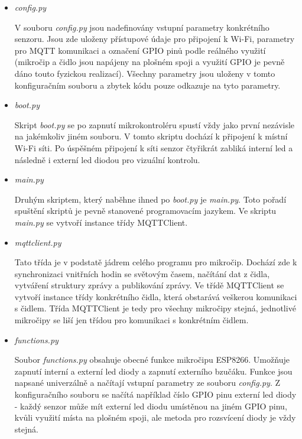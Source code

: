 \begin{itemize}
  \item \textit{config.py} 
  
V souboru \textit{config.py} jsou nadefinovány vstupní parametry konkrétního senzoru. Jsou zde uloženy přístupové údaje pro připojení k Wi-Fi, parametry pro MQTT komunikaci a označení GPIO pinů podle reálného využití (mikročip a čidlo jsou napájeny na plošném spoji a využití GPIO je pevně dáno touto fyzickou realizací). Všechny parametry jsou uloženy v tomto konfiguračním souboru a zbytek kódu pouze odkazuje na tyto parametry.  
  
  \item \textit{boot.py}
  
Skript \textit{boot.py} se po zapnutí mikrokontroléru spustí vždy jako první nezávisle na jakémkoliv jiném souboru. V tomto skriptu dochází k připojení k místní Wi-Fi síti. Po úspěšném připojení k síti senzor čtyřikrát zabliká interní led a následně i externí led diodou pro vizuální kontrolu.  
  
  \item \textit{main.py}
 
Druhým skriptem, který naběhne ihned po \textit{boot.py} je \textit{main.py}. Toto pořadí spuštění skriptů je pevně stanovené programovacím jazykem. Ve skriptu \textit{main.py} se vytvoří instance třídy MQTTClient. 
  
  \item \textit{mqttclient.py}
  
Tato třída je v podstatě jádrem celého programu pro mikročip. Dochází zde k synchronizaci vnitřních hodin se světovým časem, načítání dat z čidla, vytváření struktury zprávy a publikování zprávy. Ve třídě MQTTClient se vytvoří instance třídy konkrétního čidla, která obstarává veškerou komunikaci s čidlem. Třída MQTTClient je tedy pro všechny mikročipy stejná, jednotlivé mikročipy se liší jen třídou pro komunikaci s konkrétním čidlem.   
  
  \item \textit{functions.py}
  
Soubor \textit{functions.py} obsahuje obecné funkce mikročipu ESP8266. Umožňuje zapnutí interní a externí led diody a zapnutí externího bzučáku. Funkce jsou napsané univerzálně a načítají vstupní parametry ze souboru \textit{config.py}. Z konfiguračního souboru se načítá například číslo GPIO pinu externí led diody - každý senzor může mít externí led diodu umístěnou na jiném GPIO pinu, kvůli využití místa na plošném spoji, ale metoda pro rozsvícení diody je vždy stejná.  
\end{itemize} 
 
